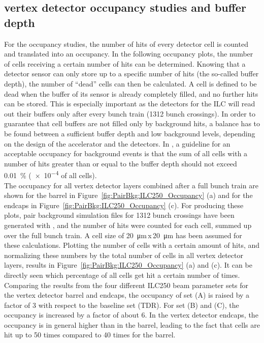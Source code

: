 \subsection{\sid vertex detector occupancy studies and buffer depth}
\label{PairBkg:occupancy}
For the occupancy studies, the number of hits of every detector cell is counted and translated into an occupancy.
In the following occupancy plots, the number of cells receiving a certain number of hits can be determined.
Knowing that a detector sensor can only store up to a specific number of hits (the so-called buffer depth), the number of ``dead'' cells can then be calculated.
A cell is defined to be dead when the buffer of its sensor is already completely filled, and no further hits can be stored.
This is especially important as the detectors for the ILC will read out their buffers only after every bunch train (\num{1312} bunch crossings).
In order to guarantee that cell buffers are not filled only by background hits, a balance has to be found between a sufficient buffer depth and low background levels, depending on the design of the accelerator and the detectors.
In \sid, a guideline for an acceptable occupancy for background events is that the sum of all cells with a number of hits greater than or equal to the buffer depth should not exceed \SI{0.01}{\percent} (\num{e-4} of all cells).\\
The occupancy for all vertex detector layers combined after a full bunch train are shown for the barrel in Figure~\ref{fig:PairBkg:ILC250_Occupancy} (a) and for the endcaps in Figure~\ref{fig:PairBkg:ILC250_Occupancy} (c).
For producing these plots, pair background simulation files for \num{1312} bunch crossings have been generated with \guineapig, and the number of hits were counted for each cell, summed up over the full bunch train.
A cell size of \SI{20}{\micro\meter}\,x\,\SI{20}{\micro\meter} has been assumed for these calculations.
Plotting the number of cells with a certain amount of hits, and normalizing these numbers by the total number of cells in all vertex detector layers, results in Figure~\ref{fig:PairBkg:ILC250_Occupancy} (a) and (c).
It can be directly seen which percentage of all cells get hit a certain number of times.
Comparing the results from the four different ILC250 beam parameter sets for the vertex detector barrel and endcaps, the occupancy of set (A) is raised by a factor of 3 with respect to the baseline set (TDR).
For set (B) and (C), the occupancy is increased by a factor of about 6.
In the vertex detector endcaps, the occupancy is in general higher than in the barrel, leading to the fact that cells are hit up to 50 times compared to 40 times for the barrel.
